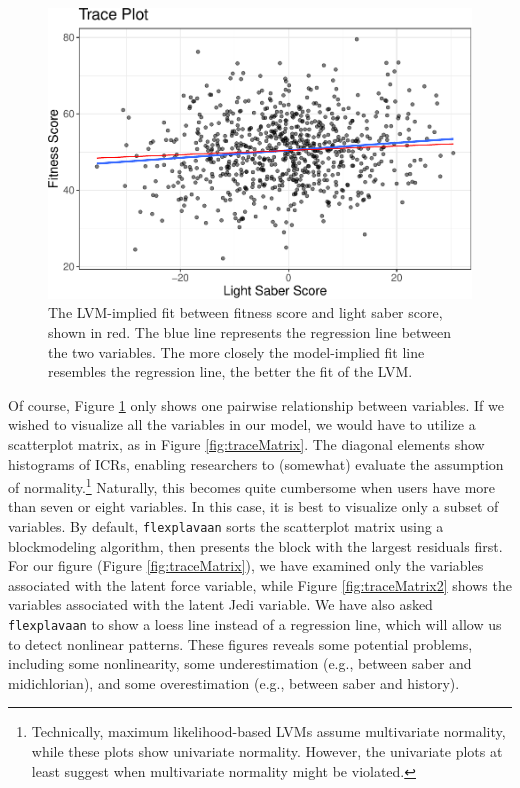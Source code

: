 \documentclass[
  english,
  doc]{apa6}
\begin{document}
\begin{figure}
\centering
\includegraphics{flexplavaan_draft_files/figure-latex/trace1-1.pdf}
\caption{\label{fig:trace1}The LVM-implied fit between fitness score and light saber score, shown in red. The blue line represents the regression line between the two variables. The more closely the model-implied fit line resembles the regression line, the better the fit of the LVM.}
\end{figure}

Of course, Figure \ref{fig:trace1} only shows one pairwise relationship between variables. If we wished to visualize all the variables in our model, we would have to utilize a scatterplot matrix, as in Figure \ref{fig:traceMatrix}. The diagonal elements show histograms of ICRs, enabling researchers to (somewhat) evaluate the assumption of normality.\footnote{Technically, maximum likelihood-based LVMs assume multivariate normality, while these plots show univariate normality. However, the univariate plots at least suggest when multivariate normality might be violated.} Naturally, this becomes quite cumbersome when users have more than seven or eight variables. In this case, it is best to visualize only a subset of variables. By default, \texttt{flexplavaan} sorts the scatterplot matrix using a blockmodeling algorithm, then presents the block with the largest residuals first. For our figure (Figure \ref{fig:traceMatrix}), we have examined only the variables associated with the latent force variable, while Figure \ref{fig:traceMatrix2} shows the variables associated with the latent Jedi variable. We have also asked \texttt{flexplavaan} to show a loess line instead of a regression line, which will allow us to detect nonlinear patterns. These figures reveals some potential problems, including some nonlinearity, some underestimation (e.g., between saber and midichlorian), and some overestimation (e.g., between saber and history).
\end{document}
